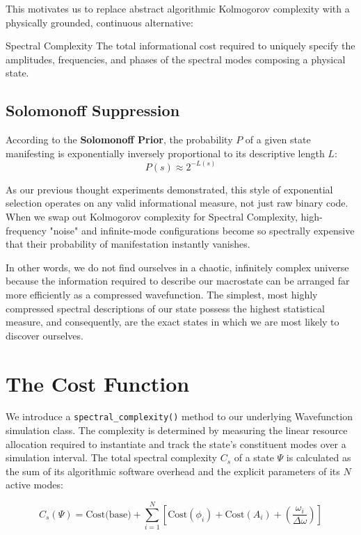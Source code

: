 This motivates us to replace abstract algorithmic Kolmogorov complexity with a physically grounded, continuous alternative:

\begin{definition}{Spectral Complexity}
The total informational cost required to uniquely specify the amplitudes, frequencies, and phases of the spectral modes composing a physical state.
\end{definition}


\subsection*{Solomonoff Suppression}

According to the \textbf{Solomonoff Prior}, the probability $P$ of a given state manifesting is exponentially inversely proportional to its descriptive length $L$:
\[
P(s) \approx 2^{-L(s)}
\]

As our previous thought experiments demonstrated, this style of exponential selection operates on any valid informational measure, not just raw binary code.
When we swap out Kolmogorov complexity for Spectral Complexity, high-frequency "noise" and infinite-mode configurations become so spectrally expensive 
that their probability of manifestation instantly vanishes. 

In other words, we do not find ourselves in a chaotic, infinitely complex universe because the information required to describe our macrostate can be arranged far 
more efficiently as a compressed wavefunction.
The simplest, most highly compressed spectral descriptions of our state possess the highest statistical measure, and consequently, are the exact states in which we are most likely to discover ourselves.


\section*{The Cost Function}

We introduce a \texttt{spectral\_complexity()} method to our underlying Wavefunction simulation class. 
The complexity is determined by measuring the linear resource allocation required to instantiate and track the state's constituent modes over a simulation interval. 
The total spectral complexity $C_s$ of a state $\Psi$ is calculated as the sum of its algorithmic software overhead and the explicit parameters of its $N$ active modes:

\[
C_s(\Psi) = \text{Cost(base)} + \sum_{i=1}^{N} \left[ \text{Cost}(\phi_i) + \text{Cost}(A_i) + \left(\frac{\omega_i}{\Delta\omega}\right) \right]
\]


